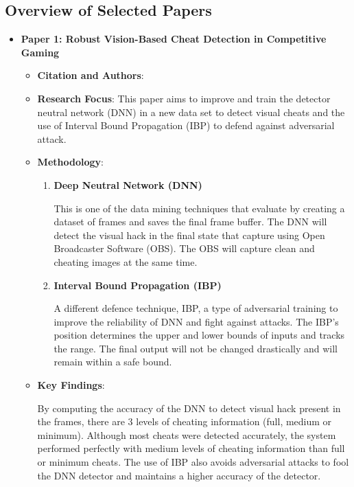 \documentclass[a4paper, 12pt]{article}
\begin{document}
\subsection{Overview of Selected Papers}
\begin{itemize}
    \item \textbf{Paper 1: Robust Vision-Based Cheat Detection in Competitive Gaming} 
    \begin{itemize}
        \item \textbf{Citation and Authors}: \cite{jonnalagadda_2021_robust}
        \item \textbf{Research Focus}: This paper aims to improve and train the detector neutral network (DNN) in a new data set to detect visual cheats and the use of Interval Bound Propagation (IBP) to defend against adversarial attack. 
        \item \textbf{Methodology}: 
        \begin{enumerate}
            \item \textbf{Deep Neutral Network (DNN)}
            
                This is one of the data mining techniques that evaluate by creating a dataset of frames and saves the final frame buffer.  The DNN will detect the visual hack in the final state that capture using Open Broadcaster Software (OBS). The OBS will capture clean and cheating images at the same time.

            \item \textbf{Interval Bound Propagation (IBP)}

                A different defence technique, IBP, a type of adversarial training to improve the reliability of DNN and fight against attacks. The IBP's position determines the upper and lower bounds of inputs and tracks the range. The final output will not be changed drastically and will remain within a safe bound. 
                
        \end{enumerate}
        \item \textbf{Key Findings}:

        By computing the accuracy of the DNN to detect visual hack present in the frames, there are 3 levels of cheating information (full, medium or minimum). Although most cheats were detected accurately, the system performed perfectly with medium levels of cheating information than full or minimum cheats. The use of IBP also avoids adversarial attacks to fool the DNN detector and maintains a higher accuracy of the detector. 
        

\end{itemize}
\end{itemize}
\end{document}
